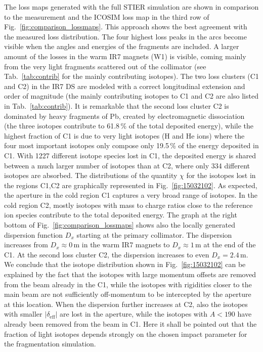 The loss maps generated with the full STIER simulation are shown in comparison to the measurement and the ICOSIM loss map in the third row of Fig.~\ref{fig:comparison_lossmaps}. This approach shows the best agreement with the measured loss distribution. The four highest loss peaks in the arcs become visible when the angles and energies of the fragments are included. 
%
A larger amount of the losses in the warm IR7 magnets (W1) is visible, coming mainly from the very light fragments scattered out of the collimator (see Tab.~\ref{tab:contrib} for the mainly contributing isotopes). The two loss clusters (C1 and C2) in the IR7 DS are modeled with a correct longitudinal extension and order of magnitude (the mainly contributing isotopes to C1 and C2 are also listed in Tab.~\ref{tab:contrib}). It is remarkable that the second loss cluster C2 is dominated by heavy fragments of Pb, created by electromagnetic dissociation (the three isotopes contribute to 61.8\,\% of the total deposited energy), while the highest fraction of C1 is due to very light isotopes (H and He ions) where the four most important isotopes only compose only 19.5\,\% of the energy deposited in C1. With 1227 different isotope species lost in C1, the deposited energy is shared between a much larger number of isotopes than at C2, where only 334 different isotopes are absorbed. 
%
The distributions of the quantity $\chi$ for the isotopes lost in the regions C1,C2 are graphically represented in Fig.~\ref{fig:15032102}. As expected, the aperture in the cold region C1 captures a very broad range of isotopes. In the cold region C2, mostly isotopes with mass to charge ratios close to the reference ion species contribute to the total deposited energy. 
%
The graph at the right bottom of Fig.~\ref{fig:comparison_lossmaps} shows also the locally generated dispersion function $D_x$ starting at the primary collimator. The dispersion increases from $D_x\approx0\,$m in the warm IR7 magnets to $D_x \approx 1\,$m at the end of the C1. At the second loss cluster C2, the dispersion increases to even $D_x=2.4\,$m. We conclude that the isotope distribution shown in Fig.~\ref{fig:15032102} can be explained by the fact that the isotopes with large momentum offsets are removed from the beam already in the C1, while the isotopes with rigidities closer to the main beam are not sufficiently off-momentum to be intercepted by the aperture at this location. When the dispersion further increases at C2, also the isotopes with smaller $|\delta_\text{eff}|$ are lost in the aperture, while the isotopes with $A<190$ have already been removed from the beam in C1. Here it shall be pointed out that the fraction of light isotopes depends strongly on the chosen impact parameter for the fragmentation simulation.



